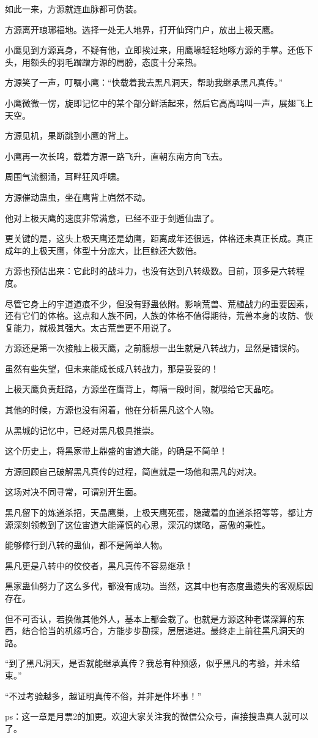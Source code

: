 \begin{this_body}
如此一来，方源就连血脉都可伪装。

方源离开琅琊福地。选择一处无人地界，打开仙窍门户，放出上极天鹰。

小鹰见到方源真身，不疑有他，立即挨过来，用鹰喙轻轻地啄方源的手掌。还低下头，用额头的羽毛蹭蹭方源的肩膀，态度十分亲热。

方源笑了一声，叮嘱小鹰：“快载着我去黑凡洞天，帮助我继承黑凡真传。”

小鹰微微一愣，旋即记忆中的某个部分鲜活起来，然后它高高鸣叫一声，展翅飞上天空。

方源见机，果断跳到小鹰的背上。

小鹰再一次长鸣，载着方源一路飞升，直朝东南方向飞去。

周围气流翻涌，耳畔狂风呼啸。

方源催动蛊虫，坐在鹰背上岿然不动。

他对上极天鹰的速度非常满意，已经不亚于剑遁仙蛊了。

更关键的是，这头上极天鹰还是幼鹰，距离成年还很远，体格还未真正长成。真正成年的上极天鹰，体型十分庞大，比巨鲸还大数倍。

方源也预估出来：它此时的战斗力，也没有达到八转级数。目前，顶多是六转程度。

尽管它身上的宇道道痕不少，但没有野蛊依附。影响荒兽、荒植战力的重要因素，还有它们的体格。这点和人族不同，人族的体格不值得期待，荒兽本身的攻防、恢复能力，就极其强大。太古荒兽更不用说了。

方源还是第一次接触上极天鹰，之前臆想一出生就是八转战力，显然是错误的。

虽然有些失望，但未来能成长成八转战力，那是妥妥的！

上极天鹰负责赶路，方源坐在鹰背上，每隔一段时间，就喂给它天晶吃。

其他的时候，方源也没有闲着，他在分析黑凡这个人物。

从黑城的记忆中，已经对黑凡极具推崇。

这个历史上，将黑家带上鼎盛的宙道大能，的确是不简单！

方源回顾自己破解黑凡真传的过程，简直就是一场他和黑凡的对决。

这场对决不同寻常，可谓别开生面。

黑凡留下的炼道杀招，天晶鹰巢，上极天鹰死蛋，隐藏着的血道杀招等等，都让方源深刻领教到了这位宙道大能谨慎的心思，深沉的谋略，高傲的秉性。

能够修行到八转的蛊仙，都不是简单人物。

黑凡更是八转中的佼佼者，黑凡真传不容易继承！

黑家蛊仙努力了这么多代，都没有成功。当然，这其中也有态度蛊遗失的客观原因存在。

但不可否认，若换做其他外人，基本上都会栽了。也就是方源这种老谋深算的东西，结合恰当的机缘巧合，方能步步勘探，层层递进。最终走上前往黑凡洞天的路。

“到了黑凡洞天，是否就能继承真传？我总有种预感，似乎黑凡的考验，并未结束。”

“不过考验越多，越证明真传不俗，并非是件坏事！”

ps：这一章是月票2的加更。欢迎大家关注我的微信公众号，直接搜蛊真人就可以了。

\end{this_body}

